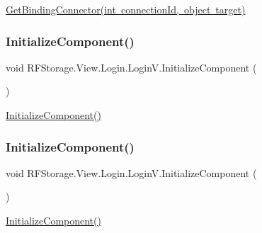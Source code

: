 \mbox{\hyperlink{class_r_f_storage_1_1_view_1_1_login_1_1_login_v_a163882764068d01be363bbdc0dc278cd}{Get\+Binding\+Connector(int connection\+Id, object target)}} 

\mbox{\label{class_r_f_storage_1_1_view_1_1_login_1_1_login_v_a538dafe420b2a8cba6fdf609380af5e8}} 
\subsubsection{\texorpdfstring{InitializeComponent()}{InitializeComponent()}\hspace{0.1cm}{\footnotesize\ttfamily [1/8]}}
{\footnotesize\ttfamily void R\+F\+Storage.\+View.\+Login.\+Login\+V.\+Initialize\+Component (\begin{DoxyParamCaption}{ }\end{DoxyParamCaption})}



\mbox{\hyperlink{class_r_f_storage_1_1_view_1_1_login_1_1_login_v_a538dafe420b2a8cba6fdf609380af5e8}{Initialize\+Component()}} 

\mbox{\label{class_r_f_storage_1_1_view_1_1_login_1_1_login_v_a538dafe420b2a8cba6fdf609380af5e8}} 
\subsubsection{\texorpdfstring{InitializeComponent()}{InitializeComponent()}\hspace{0.1cm}{\footnotesize\ttfamily [2/8]}}
{\footnotesize\ttfamily void R\+F\+Storage.\+View.\+Login.\+Login\+V.\+Initialize\+Component (\begin{DoxyParamCaption}{ }\end{DoxyParamCaption})}



\mbox{\hyperlink{class_r_f_storage_1_1_view_1_1_login_1_1_login_v_a538dafe420b2a8cba6fdf609380af5e8}{Initialize\+Component()}} 

